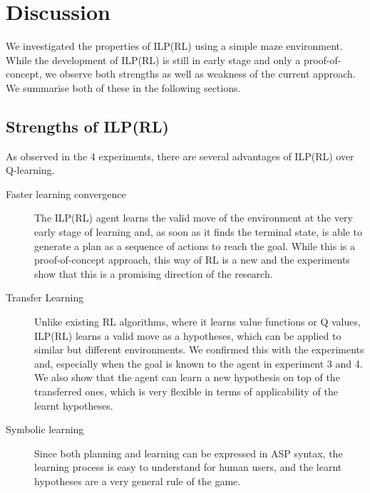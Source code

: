 \clearpage

\section{Discussion}
\label{sec:discussion}

We investigated the properties of ILP(RL) using a simple maze environment. While the development of ILP(RL) is still in early stage and only a proof-of-concept, 
we observe both strengths as well as weakness of the current approach. We summarise both of these in the following sections.

\subsection{Strengths of ILP(RL)}
As observed in the 4 experiments, there are several advantages of ILP(RL) over Q-learning.

\begin{description}
\item[Faster learning convergence]
The ILP(RL) agent learns the valid move of the environment at the very early stage of learning and, as soon as it finds the terminal state, is able to generate a plan as a sequence of actions to reach the goal.
While this is a proof-of-concept approach, this way of RL is a new and the experiments show that this is a promising direction of the research.

\item[Transfer Learning]
Unlike existing RL algorithms, where it learns value functions or Q values, ILP(RL) learns a valid move as a hypotheses, which can be applied to similar but different environments.
We confirmed this with the experiments and, especially when the goal is known to the agent in experiment 3 and 4.
We also show that the agent can learn a new hypothesis on top of the transferred ones, which is very flexible in terms of applicability of the learnt hypotheses.

\item[Symbolic learning]
Since both planning and learning can be expressed in ASP syntax, the learning process is easy to understand for human users, and the learnt hypotheses are a very general rule of the game.
\end{description} 


